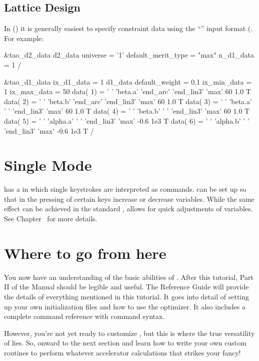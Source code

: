 \subsection{Lattice Design}
\label{ss:lattice_design}

In  () it is generally
easiest to specify constraint data using the ``''
input format (. For example:
\begin{example}
&tao_d2_data
  d2_data%
  universe = '1'
  default_merit_type = "max"
  n_d1_data = 1
/

&tao_d1_data
  ix_d1_data = 1
  d1_data%
  default_weight = 0.1
  ix_min_data = 1
  ix_max_data = 50
  data( 1) = ' '  'beta.a'  'end_arc' 'end_lin3' 'max'    60   1.0   T
  data( 2) = ' '  'beta.b'  'end_arc' 'end_lin3' 'max'    60   1.0   T
  data( 3) = ' '  'beta.a'  ' '       'end_lin3' 'max'    60   1.0   T
  data( 4) = ' '  'beta.b'  ' '       'end_lin3' 'max'    60   1.0   T
  data( 5) = ' '  'alpha.a' ' '       'end_lin3' 'max'   -0.6  1e3   T 
  data( 6) = ' '  'alpha.b' ' '       'end_lin3' 'max'   -0.6  1e3   T 
/
\end{example}


\section{Single Mode}
\label{s:single.mode}

\tao has a  in which single keystrokes are interpreted
as commands. \tao can be set up so that in  the
pressing of certain keys increase or decrease variables. While the
same effect can be achieved in the standard ,  allows for quick adjustments of variables. See
Chapter~ for more details.

\section{Where to go from here}
\label{s:where.to.go}

You now have an understanding of the basic abilities of \tao. After
this tutorial, Part II of the \tao Manual should be legible and
useful.  The Reference Guide will provide the details of everything
mentioned in this tutorial.  It goes into detail of setting up your
own initialization files and how to use the optimizer. It also
includes a complete command reference with command syntax.

However, you're not yet ready to customize \tao, but this is where the
true versatility of \tao lies. So, onward to the next section and
learn how to write your own custom routines to perform whatever
accelerator calculations that strikes your fancy!

